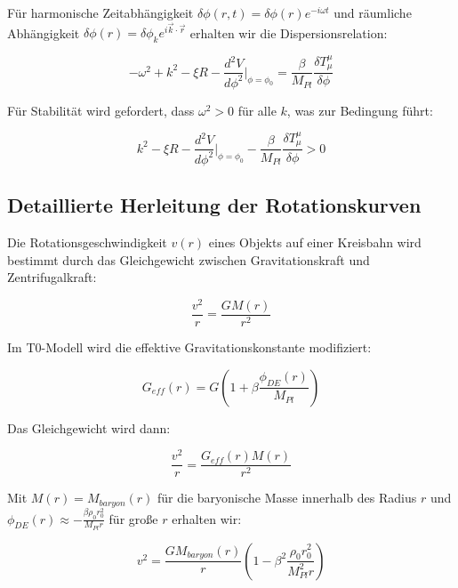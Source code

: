 \documentclass[a4paper,12pt]{article}
\begin{document}
	Für harmonische Zeitabhängigkeit $\delta\phi(r,t) = \delta\phi(r)e^{-i\omega t}$ und räumliche Abhängigkeit $\delta\phi(r) = \delta\phi_k e^{i\vec{k}\cdot\vec{r}}$ erhalten wir die Dispersionsrelation:
	
	\begin{equation}
		-\omega^2 + k^2 - \xi R - \frac{d^2V}{d\phi^2}\bigg|_{\phi=\phi_0} = \frac{\beta}{M_{Pl}}\frac{\delta T^{\mu}_{\mu}}{\delta\phi}
	\end{equation}
	
	Für Stabilität wird gefordert, dass $\omega^2 > 0$ für alle $k$, was zur Bedingung führt:
	
	\begin{equation}
		k^2 - \xi R - \frac{d^2V}{d\phi^2}\bigg|_{\phi=\phi_0} - \frac{\beta}{M_{Pl}}\frac{\delta T^{\mu}_{\mu}}{\delta\phi} > 0
	\end{equation}
	
	\subsection{Detaillierte Herleitung der Rotationskurven}
	
	Die Rotationsgeschwindigkeit $v(r)$ eines Objekts auf einer Kreisbahn wird bestimmt durch das Gleichgewicht zwischen Gravitationskraft und Zentrifugalkraft:
	
	\begin{equation}
		\frac{v^2}{r} = \frac{GM(r)}{r^2}
	\end{equation}
	
	Im T0-Modell wird die effektive Gravitationskonstante modifiziert:
	
	\begin{equation}
		G_{eff}(r) = G\left(1 + \beta\frac{\phi_{DE}(r)}{M_{Pl}}\right)
	\end{equation}
	
	Das Gleichgewicht wird dann:
	
	\begin{equation}
		\frac{v^2}{r} = \frac{G_{eff}(r)M(r)}{r^2}
	\end{equation}
	
	Mit $M(r) = M_{baryon}(r)$ für die baryonische Masse innerhalb des Radius $r$ und $\phi_{DE}(r) \approx -\frac{\beta\rho_0 r_0^2}{M_{Pl}r}$ für große $r$ erhalten wir:
	
	\begin{equation}
		v^2 = \frac{GM_{baryon}(r)}{r}\left(1 - \beta^2\frac{\rho_0 r_0^2}{M_{Pl}^2 r}\right)
	\end{equation}
	
\end{document}
